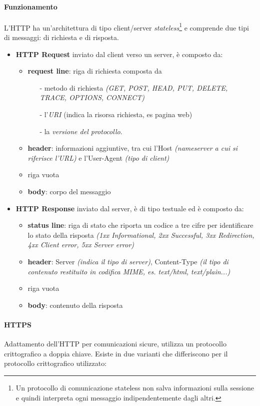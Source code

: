 \documentclass[a4paper,11pt]{article}
\def\para#1{\paragraph{#1}\label{#1}}
\def\italic#1{\textit{#1}}
\begin{document}
\paragraph{Funzionamento} L'HTTP ha un'architettura di tipo client/server \italic{stateless}\footnote{Un protocollo di comunicazione stateless non salva informazioni sulla sessione e quindi interpreta ogni messaggio indipendentemente dagli altri.} e comprende due tipi di messaggi: di richiesta e di risposta.
\begin{itemize}
\item \textbf{HTTP Request} inviato dal client verso un server, è composto da:
\begin{itemize}
\item \textbf{request line}: riga di richiesta composta da
\begin{itemize}
\item[-] metodo di richiesta \textit{(GET, POST, HEAD, PUT, DELETE, TRACE, OPTIONS, CONNECT)}
\item[-] l'\textit{URI} (indica la risorsa richiesta, es pagina web) 
\item[-] la\textit{ versione del protocollo}.
\end{itemize}
\item \textbf{header}: informazioni aggiuntive, tra cui l'Host \textit{(nameserver a cui si riferisce l'URL)} e l'User-Agent \textit{(tipo di client)}
\item riga vuota
\item \textbf{body}: corpo del messaggio
\end{itemize}
\item \textbf{HTTP Response} inviato dal server, è di tipo testuale ed è composto da:
\begin{itemize}
\item \textbf{status line}: riga di stato che riporta un codice a tre cifre per identificare lo stato della risposta \textit{(1xx Informational, 2xx Successful, 3xx Redirection, 4xx Client error, 5xx Server error)}
\item \textbf{header}: Server \textit{(indica il tipo di server)}, Content-Type \textit{(il tipo di contenuto restituito in codifica MIME, es. text/html, text/plain...)}
\item riga vuota
\item \textbf{body}: contenuto della risposta
\end{itemize}
\end{itemize}
\para{HTTPS} Adattamento dell'HTTP per comunicazioni sicure, utilizza un protocollo crittografico a doppia chiave. Esiste in due varianti che differiscono per il protocollo crittografico  utilizzato:
\end{document}
